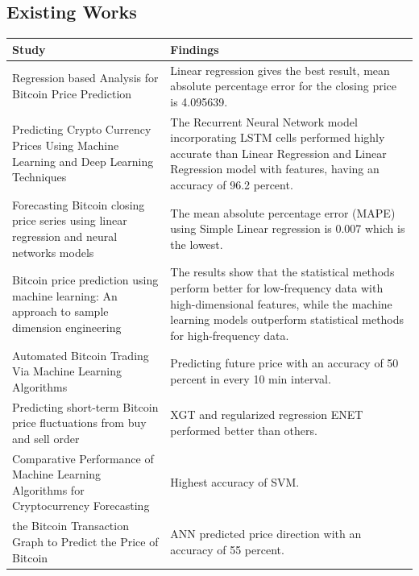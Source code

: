\documentclass{IEEEtran}
\begin{document}
\subsection{Existing Works}
\begin{center}
\begin{tabular} {| m{25em} | m{25em}|} \hline
Study & Findings \\ \hline
Regression based Analysis for Bitcoin Price Prediction\cite{Fahmi2018} & Linear regression gives the best result, mean absolute percentage error for the closing price is 4.095639.  \\ \hline
Predicting Crypto Currency Prices Using Machine Learning and Deep Learning Techniques \cite{Vaddi2020} & The Recurrent Neural Network model incorporating LSTM cells performed highly accurate than Linear Regression and Linear Regression model with features, having an accuracy of 96.2 percent. \\ \hline
Forecasting Bitcoin closing price series using linear regression and neural networks models \cite{Uras2020} & The mean absolute percentage error (MAPE) using Simple Linear regression is 0.007 which is the lowest.  \\ \hline
Bitcoin price prediction using machine learning: An approach to sample dimension engineering \cite{Ee} & The results show that the statistical methods perform better for low-frequency data with high-dimensional features, while the machine learning models outperform statistical methods for high-frequency data.  \\ \hline
Automated Bitcoin Trading Via Machine Learning Algorithms \cite{Madan} & Predicting future price with an accuracy of 50 percent in every 10 min interval. \\ \hline
Predicting short-term Bitcoin price fluctuations from buy and sell order \cite{Dd} & XGT and regularized regression ENET performed better than others. \\  \hline
Comparative Performance of Machine Learning Algorithms for Cryptocurrency Forecasting \cite{Hitam2018} & Highest accuracy of SVM. \\  \hline
 the Bitcoin Transaction Graph to Predict the Price of Bitcoin \cite{Greaves2015} & ANN predicted price direction with an accuracy of 55 percent.  \\ \hline

\end{tabular}
\end{center}
\clearpage
\end{document}
